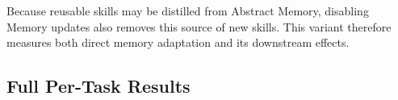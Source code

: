 \documentclass{article}
\begin{document}
\begin{table}[H]
\centering
\small
\caption{
Update scope of the component-ablation variants. A $\checkmark$ permits
persistent updates, while $\times$ keeps the component fixed.
}
\label{tab:component_ablation_config}
\setlength{\tabcolsep}{4pt}
\end{table}

Because reusable skills may be distilled from Abstract Memory, disabling
Memory updates also removes this source of new skills. This variant therefore
measures both direct memory adaptation and its downstream effects.

\subsection{Full Per-Task Results}
\end{document}
